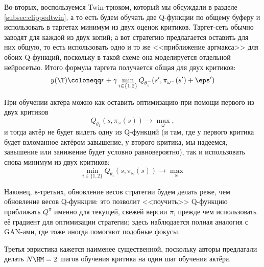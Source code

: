 Во-вторых, воспользуемся Twin-трюком, который мы обсуждали в разделе \ref{subsec:clippedtwin}, а то есть будем обучать две Q-функции по общему буферу и использовать в таргетах минимум из двух оценок критиков. Таргет-сеть обычно заводят для каждой из двух копий; а вот стратегию предлагается оставить для них общую, то есть использовать одно и то же <<приближение аргмакса>> для обоих Q-функций, поскольку в такой схеме она моделируется отдельной нейросетью. Итого формула таргета получается общая для двух критиков:
$$y(\T ) \coloneqq r + \gamma \min_{i \in \{1, 2\}}Q_{\theta_i^{-}}( s', \pi_{\omega^{-}}(s') + \eps')$$

При обучении актёра можно как оставить оптимизацию при помощи первого из двух критиков
$$Q_{\theta_1}(s, \pi_\omega(s)) \to \max_{\omega},$$
и тогда актёр не будет видеть одну из Q-функций (и там, где у первого критика будет взломанное актёром завышение, у второго критика, мы надеемся, завышение или занижение будет условно равновероятно), так и использовать снова минимум из двух критиков:
$$\min_{i \in \{1, 2\}} Q_{\theta_i}(s, \pi_\omega(s)) \to \max_{\omega}$$

Наконец, в-третьих, обновление весов стратегии будем делать реже, чем обновление весов Q-функции: это позволит <<поучить>> Q-функцию приближать $Q^\pi$ именно для текущей, свежей версии $\pi$, прежде чем использовать её градиент для оптимизации стратегии; здесь наблюдается полная аналогия с GAN-ами, где тоже иногда помогают подобные фокусы.

\begin{remark}
Третья эвристика кажется наименее существенной, поскольку авторы предлагали делать $N \HM= 2$ шагов обучения критика на один шаг обучения актёра.
\end{remark}

